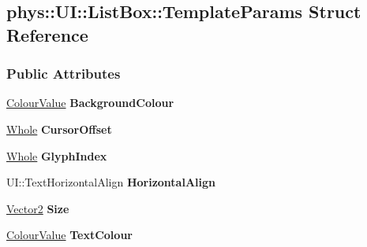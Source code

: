 \hypertarget{structphys_1_1UI_1_1ListBox_1_1TemplateParams}{
\subsection{phys::UI::ListBox::TemplateParams Struct Reference}
\label{structphys_1_1UI_1_1ListBox_1_1TemplateParams}
}
\subsubsection*{Public Attributes}
\begin{DoxyCompactItemize}
\item 
\hypertarget{structphys_1_1UI_1_1ListBox_1_1TemplateParams_a319bb787c2596381fe98d687f706ca0d}{
\hyperlink{classphys_1_1ColourValue}{ColourValue} {\bfseries BackgroundColour}}
\label{structphys_1_1UI_1_1ListBox_1_1TemplateParams_a319bb787c2596381fe98d687f706ca0d}

\item 
\hypertarget{structphys_1_1UI_1_1ListBox_1_1TemplateParams_ac00d77cc721f790866d3ae353b22a4ce}{
\hyperlink{namespacephys_a460f6bc24c8dd347b05e0366ae34f34a}{Whole} {\bfseries CursorOffset}}
\label{structphys_1_1UI_1_1ListBox_1_1TemplateParams_ac00d77cc721f790866d3ae353b22a4ce}

\item 
\hypertarget{structphys_1_1UI_1_1ListBox_1_1TemplateParams_a81846631ab90163e76c003efb41881c5}{
\hyperlink{namespacephys_a460f6bc24c8dd347b05e0366ae34f34a}{Whole} {\bfseries GlyphIndex}}
\label{structphys_1_1UI_1_1ListBox_1_1TemplateParams_a81846631ab90163e76c003efb41881c5}

\item 
\hypertarget{structphys_1_1UI_1_1ListBox_1_1TemplateParams_aa94d309daf7a156437469d60f16cdd56}{
UI::TextHorizontalAlign {\bfseries HorizontalAlign}}
\label{structphys_1_1UI_1_1ListBox_1_1TemplateParams_aa94d309daf7a156437469d60f16cdd56}

\item 
\hypertarget{structphys_1_1UI_1_1ListBox_1_1TemplateParams_ad133a43170da4860798c8bfd91ac7581}{
\hyperlink{classphys_1_1Vector2}{Vector2} {\bfseries Size}}
\label{structphys_1_1UI_1_1ListBox_1_1TemplateParams_ad133a43170da4860798c8bfd91ac7581}

\item 
\hypertarget{structphys_1_1UI_1_1ListBox_1_1TemplateParams_a766986b3df2bdd14b12cf7ba84b01ef6}{
\hyperlink{classphys_1_1ColourValue}{ColourValue} {\bfseries TextColour}}
\label{structphys_1_1UI_1_1ListBox_1_1TemplateParams_a766986b3df2bdd14b12cf7ba84b01ef6}


\end{DoxyCompactItemize}

